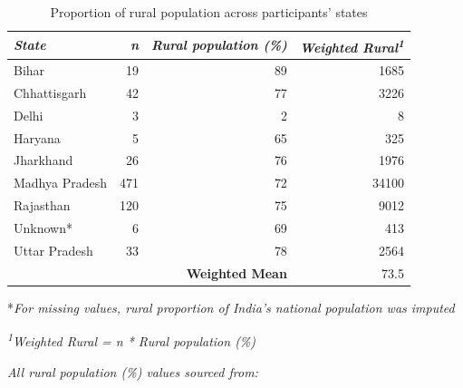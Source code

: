 \documentclass[empirical, authordate]{jote-new-article}
\begin{document}
\begin{table}

  \caption{Proportion of rural population across participants' states }
  \label{tab:tableS39}


  \begin{tabularx}{\linewidth}{@{} X  r  r  r@{}}



    \toprule
    \emph{State}   & \emph{n} & \emph{Rural population (\%)} & \emph{Weighted Rural}\textsuperscript{\emph{1}} \\

    \midrule
    Bihar          & 19       & 89                           & 1685                                            \\
    Chhattisgarh   & 42       & 77                           & 3226                                            \\
    Delhi          & 3        & 2                            & 8                                               \\
    Haryana        & 5        & 65                           & 325                                             \\
    Jharkhand      & 26       & 76                           & 1976                                            \\
    Madhya Pradesh & 471      & 72                           & 34100                                           \\
    Rajasthan      & 120      & 75                           & 9012                                            \\
    Unknown*       & 6        & 69                           & 413                                             \\
    Uttar Pradesh  & 33       & 78                           & 2564                                            \\
                   &          & \textbf{Weighted Mean}       & 73.5                                            \\
  \end{tabularx}

  *\emph{For missing values, rural proportion of India's national population was imputed }

  \textsuperscript{\emph{1}}\emph{Weighted Rural = n * Rural population (\%)}

  \emph{All rural population (\%) values sourced from: }\emph{ }

\end{table}
\end{document}
